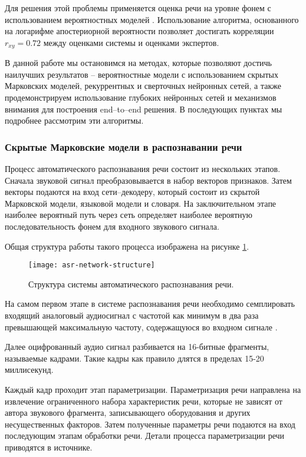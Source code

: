 Для решения этой проблемы применяется оценка речи на уровне фонем с использованием вероятностных моделей \cite{kim1997automatic}. Использование алгоритма, основанного на логарифме апостериорной вероятности позволяет достигать корреляции $r_{xy}=0.72$ между оценками системы и оценками экспертов.

В данной работе мы остановимся на методах, которые позволяют достичь наилучших результатов -- вероятностные модели с использованием скрытых Марковских моделей, рекуррентных и сверточных нейронных сетей, а также продемонстрируем использование глубоких нейронных сетей и механизмов внимания для построения end--to--end решения. В последующих пунктах мы подробнее рассмотрим эти алгоритмы.

\subsubsection{Скрытые Марковские модели в распознавании речи}
Процесс автоматического распознавания речи состоит из нескольких этапов. Сначала звуковой сигнал преобразовывается в набор векторов признаков. Затем векторы подаются на вход сети--декодеру, который состоит из скрытой Марковской модели, языковой модели и словаря. На заключительном этапе наиболее вероятный путь через сеть определяет наиболее вероятную последовательность фонем для входного звукового сигнала.

Общая структура работы такого процесса изображена на рисунке \ref{fig:asr-architecture}.
\begin{figure}[h]
	\centering
	\texttt{[image: asr-network-structure]}
	\caption{Структура системы автоматического распознавания речи.}
	\label{fig:asr-architecture}
\end{figure}

На самом первом этапе в системе распознавания речи необходимо семплировать входящий аналоговый аудиосигнал с частотой как минимум в два раза превышающей максимальную частоту, содержащуюся во входном сигнале \cite{wiki:Nyquist-Shannon_sampling_theorem, web:music_and_computers_sampling}.

Далее оцифрованный аудио сигнал разбивается на 16-битные фрагменты, называемые кадрами. Такие кадры как правило длятся в пределах 15-20 миллисекунд.

Каждый кадр проходит этап параметризации. Параметризация речи направлена на извлечение ограниченного набора характеристик речи, которые не зависят от автора звукового фрагмента, записывающего оборудования и других несущественных факторов. Затем полученные параметры речи подаются на вход последующим этапам обработки речи. Детали процесса параметризации речи приводятся в источнике\cite{ganchev2011contemporary}.

